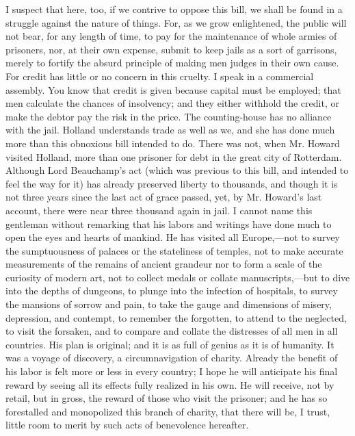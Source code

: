 I suspect that here, too, if we contrive to oppose this bill, we shall be found in a struggle against the nature of things. For, as we grow enlightened, the public will not bear, for any length of time, to pay for the maintenance of whole armies of prisoners, nor, at their own expense, submit to keep jails as a sort of garrisons, merely to fortify the absurd principle of making men judges in their own cause. For credit has little or no concern in this cruelty. I speak in a commercial assembly. You know that credit is given because capital must be employed; that men calculate the chances of insolvency; and they either withhold the credit, or make the debtor pay the risk in the price. The counting-house has no alliance with the jail. Holland understands trade as well as we, and she has done much more than this obnoxious bill intended to do. There was not, when Mr. Howard visited Holland, more than one prisoner for debt in the great city of Rotterdam. Although Lord Beauchamp's act (which was previous to this bill, and intended to feel the way for it) has already preserved liberty to thousands, and though it is not three years since the last act of grace passed, yet, by Mr. Howard's last account, there were near three thousand again in jail. I cannot name this gentleman without remarking that his labors and writings have done much to open the eyes and hearts of mankind. He has visited all Europe,—not to survey the sumptuousness of palaces or the stateliness of temples, not to make accurate measurements of the remains of ancient grandeur nor to form a scale of the curiosity of modern art, not to collect medals or collate manuscripts,—but to dive into the depths of dungeons, to plunge into the infection of hospitals, to survey the mansions of sorrow and pain, to take the gauge and dimensions of misery, depression, and contempt, to remember the forgotten, to attend to the neglected, to visit the forsaken, and to compare and collate the distresses of all men in all countries. His plan is original; and it is as full of genius as it is of humanity. It was a voyage of discovery, a circumnavigation of charity. Already the benefit of his labor is felt more or less in every country; I hope he will anticipate his final reward by seeing all its effects fully realized in his own. He will receive, not by retail, but in gross, the reward of those who visit the prisoner; and he has so forestalled and monopolized this branch of charity, that there will be, I trust, little room to merit by such acts of benevolence hereafter.

